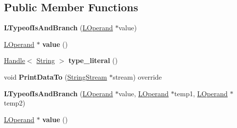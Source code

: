 \subsection*{Public Member Functions}
\begin{DoxyCompactItemize}
\item 
{\bfseries L\+Typeof\+Is\+And\+Branch} (\hyperlink{classv8_1_1internal_1_1_l_operand}{L\+Operand} $\ast$value)\hypertarget{classv8_1_1internal_1_1_l_typeof_is_and_branch_a00256b53c6cb91bed93b3ebd184d2631}{}\label{classv8_1_1internal_1_1_l_typeof_is_and_branch_a00256b53c6cb91bed93b3ebd184d2631}

\item 
\hyperlink{classv8_1_1internal_1_1_l_operand}{L\+Operand} $\ast$ {\bfseries value} ()\hypertarget{classv8_1_1internal_1_1_l_typeof_is_and_branch_a2603cea0fce697d9111db9934167d983}{}\label{classv8_1_1internal_1_1_l_typeof_is_and_branch_a2603cea0fce697d9111db9934167d983}

\item 
\hyperlink{classv8_1_1internal_1_1_handle}{Handle}$<$ \hyperlink{classv8_1_1internal_1_1_string}{String} $>$ {\bfseries type\+\_\+literal} ()\hypertarget{classv8_1_1internal_1_1_l_typeof_is_and_branch_a61ad3dcc969c207bc23a0595dd7986ef}{}\label{classv8_1_1internal_1_1_l_typeof_is_and_branch_a61ad3dcc969c207bc23a0595dd7986ef}

\item 
void {\bfseries Print\+Data\+To} (\hyperlink{classv8_1_1internal_1_1_string_stream}{String\+Stream} $\ast$stream) override\hypertarget{classv8_1_1internal_1_1_l_typeof_is_and_branch_a233c63addde13e7e702a9045d2c1789f}{}\label{classv8_1_1internal_1_1_l_typeof_is_and_branch_a233c63addde13e7e702a9045d2c1789f}

\item 
{\bfseries L\+Typeof\+Is\+And\+Branch} (\hyperlink{classv8_1_1internal_1_1_l_operand}{L\+Operand} $\ast$value, \hyperlink{classv8_1_1internal_1_1_l_operand}{L\+Operand} $\ast$temp1, \hyperlink{classv8_1_1internal_1_1_l_operand}{L\+Operand} $\ast$temp2)\hypertarget{classv8_1_1internal_1_1_l_typeof_is_and_branch_ac7ec4b167f2c59182b2548a1faee8cdd}{}\label{classv8_1_1internal_1_1_l_typeof_is_and_branch_ac7ec4b167f2c59182b2548a1faee8cdd}

\item 
\hyperlink{classv8_1_1internal_1_1_l_operand}{L\+Operand} $\ast$ {\bfseries value} ()\hypertarget{classv8_1_1internal_1_1_l_typeof_is_and_branch_a2603cea0fce697d9111db9934167d983}{}\label{classv8_1_1internal_1_1_l_typeof_is_and_branch_a2603cea0fce697d9111db9934167d983}


\end{DoxyCompactItemize}
